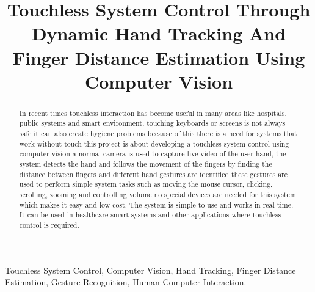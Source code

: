 \documentclass[conference]{IEEEtran}
\begin{document}
\title{Touchless System Control Through Dynamic Hand Tracking And Finger Distance Estimation Using Computer Vision}

\author{
}

\maketitle

\begin{abstract}
In recent times touchless interaction has become useful in many areas like hospitals, public systems and smart environment, touching keyboards or screens is not always safe it can also create hygiene problems because of this there is a need for systems that work without touch this project is about developing a touchless system control using computer vision a normal camera is used to capture live video of the user hand, the system detects the hand and follows the movement of the fingers by finding the distance between fingers and different hand gestures are identified these gestures are used to perform simple system tasks such as moving the mouse cursor, clicking, scrolling, zooming and controlling volume no special devices are needed for this system which makes it easy and low cost. The system is simple to use and works in real time. It can be used in healthcare smart systems and other applications where touchless control is required.
\end{abstract}

\begin{IEEEkeywords}
Touchless System Control, Computer Vision, Hand Tracking, Finger Distance Estimation, Gesture Recognition, Human-Computer Interaction.
\end{IEEEkeywords}
\end{document}
